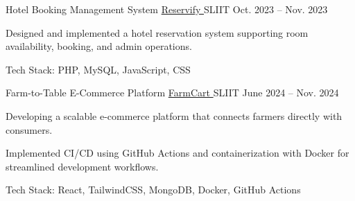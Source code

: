 
\begin{cventries}

  \cventry
    {Hotel Booking Management System} %
    {\href{https://github.com/nmdra/Reservify/}{Reservify  \faGithub}} %
    {SLIIT} %
    {Oct. 2023 -- Nov. 2023} %
    {
      \begin{cvitems} %
        \item {Designed and implemented a hotel reservation system supporting room availability, booking, and admin operations.}
        \item {Tech Stack: PHP, MySQL, JavaScript, CSS}
      \end{cvitems}
    }

  \cventry
    {Farm-to-Table E-Commerce Platform} %
    {\href{https://github.com/nmdra/FarmCart}{FarmCart  \faGithub}} %
    {SLIIT} %
    {June 2024 -- Nov. 2024} %
    {
      \begin{cvitems} %
        \item {Developing a scalable e-commerce platform that connects farmers directly with consumers.}
        \item {Implemented CI/CD using GitHub Actions and containerization with Docker for streamlined development workflows.}
        \item {Tech Stack: React, TailwindCSS, MongoDB, Docker, GitHub Actions}
      \end{cvitems}
    }

\end{cventries}
